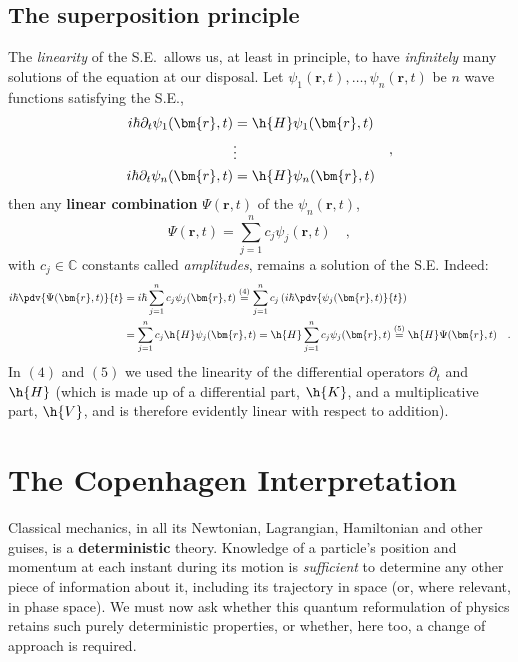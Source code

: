 \subsection{The superposition principle}
The \emph{linearity} of the S.E.\ allows us, at least in principle, to have \emph{infinitely} many solutions of the equation at our disposal. Let $\psi_1(\bm{r},t), \dots, \psi_n(\bm{r},t)$ be $n$ wave functions satisfying the S.E.,
\[
    \begin{aligned}
        i\hbar \partial_t\psi_1(\bm{r},t) &= \h{H}\psi_1(\bm{r},t)\\
        &\vdots  \\
        i\hbar \partial_t\psi_n(\bm{r},t) &= \h{H}\psi_n(\bm{r},t)
    \end{aligned}
    \quad,
\]
then any \textbf{linear combination} $\Psi(\bm{r},t)$ of the $\psi_n(\bm{r},t)$,
\begin{equation}
    \Psi(\bm{r},t) = \sum_{j=1}^n c_j\psi_j(\bm{r},t) \quad,
\end{equation}
with $c_j \in \mathbb{C}$ constants called \emph{amplitudes}, remains a solution of the S.E. Indeed:
\begin{equation*}
\begin{aligned}
    i\hbar\pdv{\Psi(\bm{r},t)}{t} &= i\hbar \sum_{j=1}^n c_j\psi_j(\bm{r},t) \overset{(4)}{=} \sum_{j=1}^n c_j \left(i\hbar \pdv{\psi_j(\bm{r},t)}{t} \right)\\ &= \sum_{j=1}^n c_j \h{H}\psi_j(\bm{r},t) = \h{H}\sum_{j=1}^n c_j\psi_j(\bm{r},t) \overset{(5)}{=} \h{H}\Psi(\bm{r},t) \quad.
\end{aligned}
\end{equation*}
In $(4)$ and $(5)$ we used the linearity of the differential operators $\partial_t$ and $\h{H}$ (which is made up of a differential part, $\h{K}$, and a multiplicative part, $\h{V}$, and is therefore evidently linear with respect to addition).

\section{The Copenhagen Interpretation}
Classical mechanics, in all its Newtonian, Lagrangian, Hamiltonian and other guises, is a \textbf{deterministic} theory. Knowledge of a particle's position and momentum at each instant during its motion is \emph{sufficient} to determine any other piece of information about it, including its trajectory in space (or, where relevant, in phase space). We must now ask whether this quantum reformulation of physics retains such purely deterministic properties, or whether, here too, a change of approach is required.

